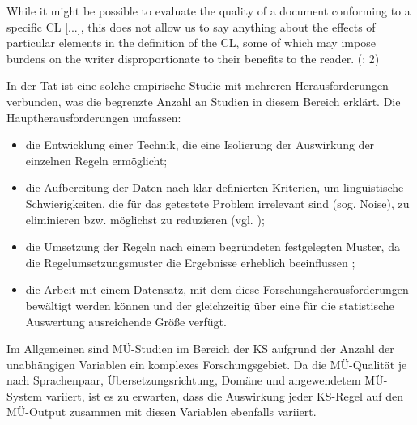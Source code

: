 While it might be possible to evaluate the quality of a document conforming to a specific CL [...], this does not allow us to say anything about the effects of particular elements in the definition of the CL, some of which may impose burdens on the writer disproportionate to their benefits to the reader. (\citealt{DouglasHurst1996}: 2)

In der Tat ist eine solche empirische Studie mit mehreren Herausforderungen verbunden, was die begrenzte Anzahl an Studien in diesem Bereich erklärt. Die Hauptherausforderungen umfassen:

\begin{itemize}
\item die Entwicklung einer Technik, die eine Isolierung der Auswirkung der einzelnen Regeln ermöglicht;
\item die Aufbereitung der Daten nach klar definierten Kriterien, um linguistische Schwierigkeiten, die für das getestete Problem irrelevant sind (sog. Noise), zu eliminieren bzw. möglichst zu reduzieren (vgl. \citealt{KingFalkedal1990});
\item die Umsetzung der Regeln nach einem begründeten festgelegten Muster, da die Regelumsetzungsmuster die Ergebnisse erheblich beeinflussen \citep[74]{Roturier2006};
\item die Arbeit mit einem Datensatz, mit dem diese Forschungsherausforderungen bewältigt werden können und der gleichzeitig über eine für die statistische Auswertung ausreichende Größe verfügt.
\end{itemize}

Im Allgemeinen sind MÜ-Studien im Bereich der KS aufgrund der Anzahl der unabhängigen Variablen ein komplexes Forschungsgebiet. Da die MÜ-Qualität je nach Sprachenpaar, Übersetzungsrichtung, Domäne und angewendetem MÜ-System variiert, ist es zu erwarten, dass die Auswirkung jeder KS-Regel auf den MÜ-Output zusammen mit diesen Variablen ebenfalls variiert. 


